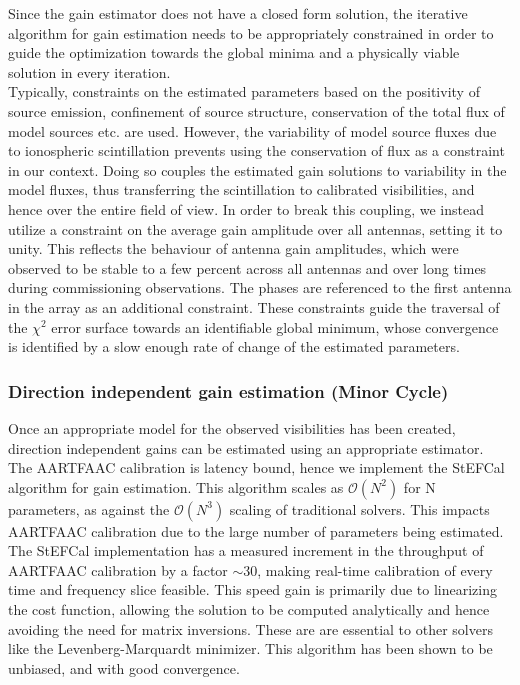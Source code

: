 \documentclass{aa}
\begin{document}
Since the  gain estimator does  not have a  closed form solution,  the iterative
algorithm for gain estimation needs  to be appropriately constrained in order to
guide  the  optimization towards  the  global  minima  and a  physically  viable
solution in every iteration.\\

Typically, constraints  on the estimated  parameters based on the  positivity of
source emission, confinement of source structure, conservation of the total flux
of model sources etc. are used.  However, the variability of model source fluxes
due to  ionospheric scintillation prevents using  the conservation of  flux as a
constraint  in our context.  Doing so  couples the  estimated gain  solutions to
variability  in  the  model  fluxes,  thus  transferring  the  scintillation  to
calibrated visibilities, and  hence over the entire field of  view.  In order to
break  this  coupling, we  instead  utilize a  constraint  on  the average  gain
amplitude over all antennas, setting it to unity. This reflects the behaviour of
antenna  gain amplitudes,  which were  observed to  be stable  to a  few percent
across all antennas and over  long times during commissioning observations.  The
phases  are referenced  to  the first  antenna  in the  array  as an  additional
constraint.  These  constraints guide  the  traversal  of  the $\chi^{2}$  error
surface towards an identifiable  global minimum, whose convergence is identified
by a slow enough rate of change of the estimated parameters.

\subsubsection{\label{sub:Direction-independent-gain}Direction independent gain
estimation (Minor Cycle)}

Once  an appropriate  model  for  the observed  visibilities  has been  created,
direction independent gains can be estimated using an appropriate estimator. The
AARTFAAC   calibration    is   latency    bound,   hence   we    implement   the
StEFCal\citep{salvini2013stef}  algorithm for  gain estimation.   This algorithm
scales   as   $\mathcal{O}(N^{2})$   for    N   parameters,   as   against   the
$\mathcal{O}(N^{3})$  scaling  of  traditional  solvers. This  impacts  AARTFAAC
calibration due to  the large number of parameters  being estimated. The StEFCal
implementation  has   a  measured  increment  in  the   throughput  of  AARTFAAC
calibration by a factor $\sim$30, making real-time calibration of every time and
frequency slice feasible.   This speed gain is primarily  due to linearizing the
cost  function, allowing  the solution  to  be computed  analytically and  hence
avoiding  the need  for  matrix inversions.  These  are are  essential to  other
solvers like  the Levenberg-Marquardt minimizer.  This algorithm  has been shown
to be unbiased, and with good convergence.
\end{document}
